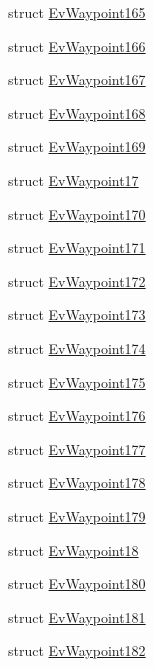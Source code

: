 \begin{DoxyCompactItemize}
\item 
struct \hyperlink{structmove__base__z__client_1_1EvWaypoint165}{Ev\+Waypoint165}
\item 
struct \hyperlink{structmove__base__z__client_1_1EvWaypoint166}{Ev\+Waypoint166}
\item 
struct \hyperlink{structmove__base__z__client_1_1EvWaypoint167}{Ev\+Waypoint167}
\item 
struct \hyperlink{structmove__base__z__client_1_1EvWaypoint168}{Ev\+Waypoint168}
\item 
struct \hyperlink{structmove__base__z__client_1_1EvWaypoint169}{Ev\+Waypoint169}
\item 
struct \hyperlink{structmove__base__z__client_1_1EvWaypoint17}{Ev\+Waypoint17}
\item 
struct \hyperlink{structmove__base__z__client_1_1EvWaypoint170}{Ev\+Waypoint170}
\item 
struct \hyperlink{structmove__base__z__client_1_1EvWaypoint171}{Ev\+Waypoint171}
\item 
struct \hyperlink{structmove__base__z__client_1_1EvWaypoint172}{Ev\+Waypoint172}
\item 
struct \hyperlink{structmove__base__z__client_1_1EvWaypoint173}{Ev\+Waypoint173}
\item 
struct \hyperlink{structmove__base__z__client_1_1EvWaypoint174}{Ev\+Waypoint174}
\item 
struct \hyperlink{structmove__base__z__client_1_1EvWaypoint175}{Ev\+Waypoint175}
\item 
struct \hyperlink{structmove__base__z__client_1_1EvWaypoint176}{Ev\+Waypoint176}
\item 
struct \hyperlink{structmove__base__z__client_1_1EvWaypoint177}{Ev\+Waypoint177}
\item 
struct \hyperlink{structmove__base__z__client_1_1EvWaypoint178}{Ev\+Waypoint178}
\item 
struct \hyperlink{structmove__base__z__client_1_1EvWaypoint179}{Ev\+Waypoint179}
\item 
struct \hyperlink{structmove__base__z__client_1_1EvWaypoint18}{Ev\+Waypoint18}
\item 
struct \hyperlink{structmove__base__z__client_1_1EvWaypoint180}{Ev\+Waypoint180}
\item 
struct \hyperlink{structmove__base__z__client_1_1EvWaypoint181}{Ev\+Waypoint181}
\item 
struct \hyperlink{structmove__base__z__client_1_1EvWaypoint182}{Ev\+Waypoint182}
\item 

\end{DoxyCompactItemize}
